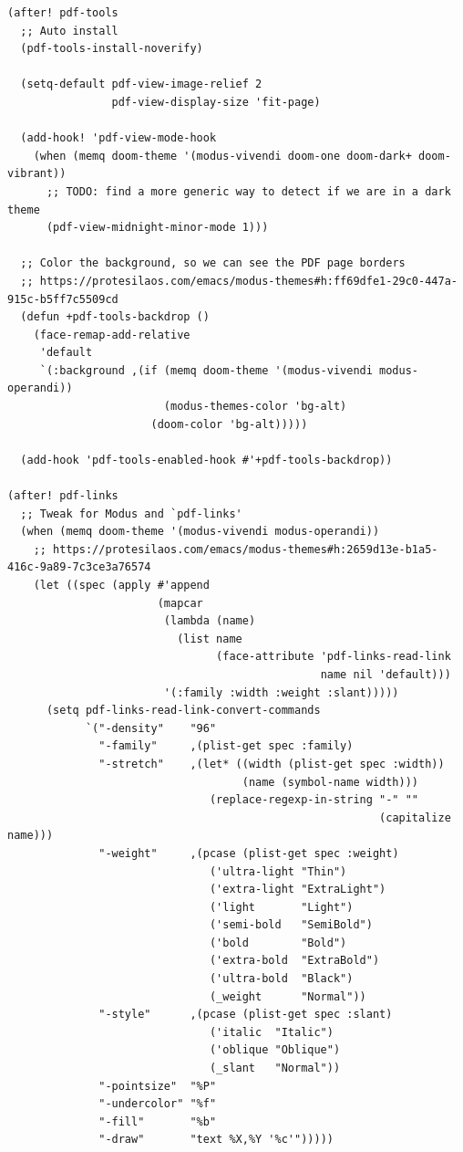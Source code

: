 \documentclass[11pt]{article}
\begin{document}
\begin{verbatim}
(after! pdf-tools
  ;; Auto install
  (pdf-tools-install-noverify)

  (setq-default pdf-view-image-relief 2
                pdf-view-display-size 'fit-page)

  (add-hook! 'pdf-view-mode-hook
    (when (memq doom-theme '(modus-vivendi doom-one doom-dark+ doom-vibrant))
      ;; TODO: find a more generic way to detect if we are in a dark theme
      (pdf-view-midnight-minor-mode 1)))

  ;; Color the background, so we can see the PDF page borders
  ;; https://protesilaos.com/emacs/modus-themes#h:ff69dfe1-29c0-447a-915c-b5ff7c5509cd
  (defun +pdf-tools-backdrop ()
    (face-remap-add-relative
     'default
     `(:background ,(if (memq doom-theme '(modus-vivendi modus-operandi))
                        (modus-themes-color 'bg-alt)
                      (doom-color 'bg-alt)))))

  (add-hook 'pdf-tools-enabled-hook #'+pdf-tools-backdrop))

(after! pdf-links
  ;; Tweak for Modus and `pdf-links'
  (when (memq doom-theme '(modus-vivendi modus-operandi))
    ;; https://protesilaos.com/emacs/modus-themes#h:2659d13e-b1a5-416c-9a89-7c3ce3a76574
    (let ((spec (apply #'append
                       (mapcar
                        (lambda (name)
                          (list name
                                (face-attribute 'pdf-links-read-link
                                                name nil 'default)))
                        '(:family :width :weight :slant)))))
      (setq pdf-links-read-link-convert-commands
            `("-density"    "96"
              "-family"     ,(plist-get spec :family)
              "-stretch"    ,(let* ((width (plist-get spec :width))
                                    (name (symbol-name width)))
                               (replace-regexp-in-string "-" ""
                                                         (capitalize name)))
              "-weight"     ,(pcase (plist-get spec :weight)
                               ('ultra-light "Thin")
                               ('extra-light "ExtraLight")
                               ('light       "Light")
                               ('semi-bold   "SemiBold")
                               ('bold        "Bold")
                               ('extra-bold  "ExtraBold")
                               ('ultra-bold  "Black")
                               (_weight      "Normal"))
              "-style"      ,(pcase (plist-get spec :slant)
                               ('italic  "Italic")
                               ('oblique "Oblique")
                               (_slant   "Normal"))
              "-pointsize"  "%P"
              "-undercolor" "%f"
              "-fill"       "%b"
              "-draw"       "text %X,%Y '%c'")))))
\end{verbatim}
\end{document}
